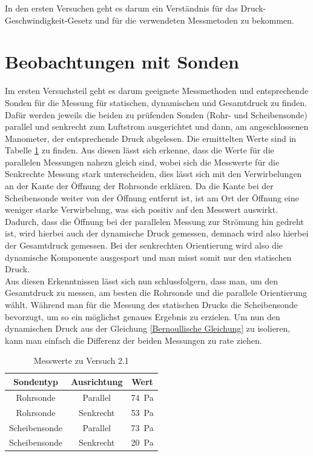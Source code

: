 In den ersten Versuchen geht es darum ein Verständnis für das Druck-Geschwindigkeit-Gesetz und für die verwendeten Messmetoden zu bekommen.

\section{Beobachtungen mit Sonden}

Im ersten Versuchsteil geht es darum geeignete Messmethoden und entsprechende Sonden für die Messung für statischen, dynamischen und Gesamtdruck zu finden. Dafür werden jeweils die beiden zu prüfenden Sonden (Rohr- und Scheibensonde) parallel und senkrecht zum Luftstrom ausgerichtet und dann, am angeschlossenen Manometer, der entsprechende Druck abgelesen. Die ermittelten Werte sind in Tabelle \ref{tab:TabelleD1} zu finden. Aus diesen lässt sich erkenne, dass die Werte für die parallelen Messungen nahezu gleich sind, wobei sich die Messwerte für die Senkrechte Messung stark unterscheiden, dies lässt sich mit den Verwirbelungen an der Kante der Öffnung der Rohrsonde erklären. Da die Kante bei der Scheibensonde weiter von der Öffnung entfernt ist, ist am Ort der Öffnung eine weniger starke Verwirbelung, was sich positiv auf den Messwert auswirkt. Dadurch, dass die Öffnung bei der parallelen Messung zur Strömung hin gedreht ist, wird hierbei auch der dynamische Druck gemessen, demnach wird also hierbei der Gesamtdruck gemessen. Bei der senkrechten Orientierung wird also die dynamische Komponente ausgespart und man misst somit nur den statischen Druck. \\
Aus diesen Erkenntnissen lässt sich nun schlussfolgern, dass man, um den Gesamtdruck zu messen, am besten die Rohrsonde und die parallele Orientierung wählt. Während man für die Messung des statischen Drucks die Scheibensonde bevorzugt, um so ein möglichst genaues Ergebnis zu erzielen. Um nun den dynamischen Druck aus der Gleichung \ref{Bernoullische Gleichung} zu isolieren, kann man einfach die Differenz der beiden Messungen zu rate ziehen.

\begin{table}[h!]
    \centering
    \caption{Messwerte zu Versuch 2.1}
    \begin{tabular}{c c c}
    	\hline
    	Sondentyp & Ausrichtung & Wert \\
    	\hline
    	Rohrsonde & Parallel &  \SI{74}{\pascal}\\
    	Rohrsonde  & Senkrecht & \SI{53}{\pascal}\\
    	Scheibensonde & Parallel & \SI{73}{\pascal}\\
    	Scheibensonde & Senkrecht &  \SI{20}{\pascal}\\
    	\hline
    \end{tabular}
    \label{tab:TabelleD1}
\end{table}

